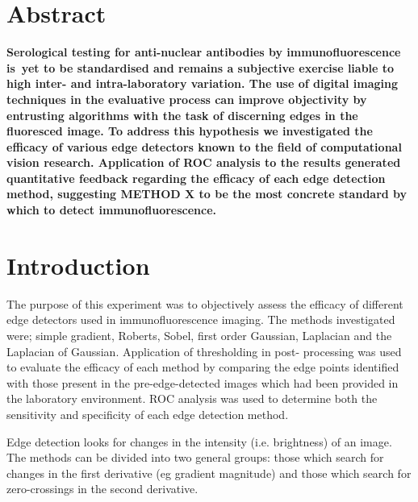 \documentclass[a4paper]{article}
\begin{document}
\vspace{1em}

\vspace{.5em}

\begin{multicols*}{2}

\section*{\normalsize Abstract}

\textbf{\small Serological testing for anti-nuclear antibodies by immunofluorescence is~yet to be standardised and remains a subjective exercise liable to high inter- and intra-laboratory variation. The use of digital imaging techniques in the evaluative process can improve objectivity by entrusting algorithms with the task of discerning edges in the fluoresced image. To address this hypothesis we investigated the efficacy of various edge detectors known to the field of computational vision research. Application of ROC analysis to the results generated quantitative feedback regarding the efficacy of each edge detection method, suggesting METHOD X to be the most concrete standard by which to detect immunofluorescence.}

\section*{Introduction}

The purpose of this experiment was to objectively assess the efficacy of different edge detectors used in immunofluorescence imaging. The methods investigated were; simple gradient, Roberts, Sobel, first order Gaussian, Laplacian and the Laplacian of Gaussian. Application of thresholding in post- processing was used to evaluate the efficacy of each method by comparing the edge points identified with those present in the pre-edge-detected images which had been provided in the laboratory environment. ROC analysis was used to determine both the sensitivity and specificity of each edge detection method. 

Edge detection looks for changes in the intensity (i.e. brightness) of an image. The methods can be divided into two general groups: those which search for changes in the first derivative (eg gradient magnitude) and those which search for zero-crossings in the second derivative. 


\end{multicols*}
\end{document}
